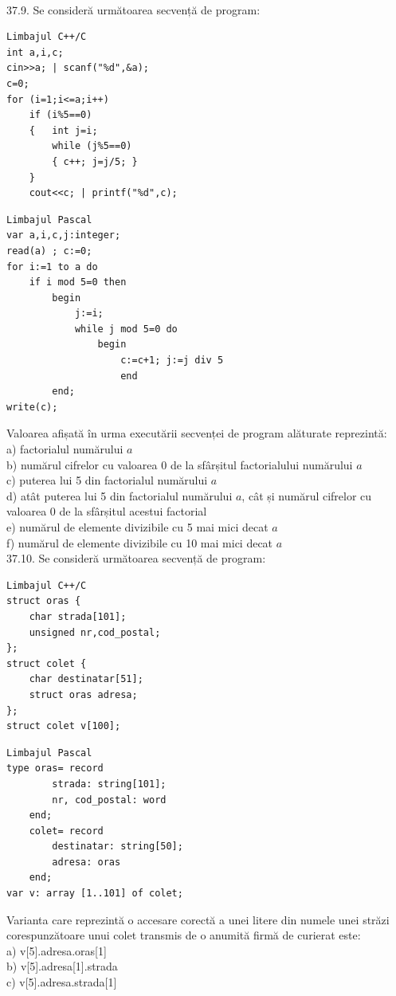 \begin{itemize}
\begin{enumerate}
\\
37.9. Se consideră următoarea secvență de program:
\begin{verbatim}
Limbajul C++/C
int a,i,c;
cin>>a; | scanf("%d",&a);
c=0;
for (i=1;i<=a;i++)
    if (i%5==0)
    {   int j=i;
        while (j%5==0)
        { c++; j=j/5; }
    }
    cout<<c; | printf("%d",c);
\end{verbatim}
\begin{verbatim}
Limbajul Pascal
var a,i,c,j:integer;
read(a) ; c:=0;
for i:=1 to a do
    if i mod 5=0 then
        begin
            j:=i;
            while j mod 5=0 do
                begin
                    c:=c+1; j:=j div 5
                    end
        end;
write(c);
\end{verbatim}
Valoarea afișată în urma executării secvenței de program alăturate reprezintă:
\\
a) factorialul numărului $a$
\\
b) numărul cifrelor cu valoarea 0 de la sfârșitul factorialului numărului $a$
\\
c) puterea lui 5 din factorialul numărului $a$
\\
d) atât puterea lui 5 din factorialul numărului $a$, cât și numărul cifrelor cu valoarea 0 de la sfârșitul acestui factorial
\\
e) numărul de elemente divizibile cu 5 mai mici decat $a$
\\
f) numărul de elemente divizibile cu 10 mai mici decat $a$
\\
37.10. Se consideră următoarea secvență de program:
\begin{verbatim}
Limbajul C++/C
struct oras {
    char strada[101];
    unsigned nr,cod_postal;
};
struct colet {
    char destinatar[51];
    struct oras adresa;
};
struct colet v[100];
\end{verbatim}
\begin{verbatim}
Limbajul Pascal
type oras= record
        strada: string[101];
        nr, cod_postal: word
    end;
    colet= record
        destinatar: string[50];
        adresa: oras
    end;
var v: array [1..101] of colet;
\end{verbatim}
Varianta care reprezintă o accesare corectă a unei litere din numele unei străzi corespunzătoare unui colet transmis de o anumită firmă de curierat este:
\\
a) v[5].adresa.oras[1]
\\
b) v[5].adresa[1].strada
\\
c) v[5].adresa.strada[1]
\\

\end{enumerate}
\end{itemize}
